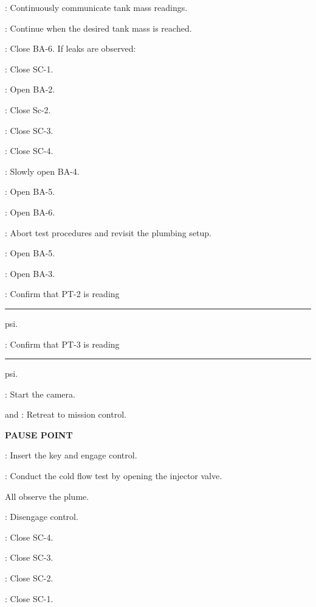 \begin{checklist}
    \begin{checklist}
            \item \daq{}: Continuously communicate tank mass readings. 
            \item \ops{}: Continue when the desired tank mass is reached.
    \end{checklist}
    \item \primary{}: Close BA-6.
    If leaks are observed:
    \begin{checklist}
            \item \primary{}: Close SC-1.
            \item \primary{}: Open BA-2.
            \item \primary{}: Close Sc-2.
            \item \primary{}: Close SC-3.
            \item \primary{}: Close SC-4. 
            \item \primary{}: Slowly open BA-4.
            \item \primary{}: Open BA-5. 
            \item \primary{}: Open BA-6. 
            \item \ops{}: Abort test procedures and revisit the plumbing setup.
    \end{checklist}
    \item \primary{}: Open BA-5.
    \item \primary{}: Open BA-3.
    \item \daq{}: Confirm that PT-2 is reading \rule{10em}{0.4pt} psi.
    \item \daq{}: Confirm that PT-3 is reading \rule{10em}{0.4pt} psi.
    \item \primary{}: Start the camera. 
    \item \primary{} and \secondary{}: Retreat to mission control.
    \item \textbf{PAUSE POINT}
    \item \control{}: Insert the key and engage control. 
    \item \control{}: Conduct the cold flow test by opening the injector valve.
    \item All observe the plume.
    \item \control{}: Disengage control.
    \item \primary{}: Close SC-4.
    \item \primary{}: Close SC-3.
    \item \primary{}: Close SC-2.
    \item \primary{}: Close SC-1.

\end{checklist}
